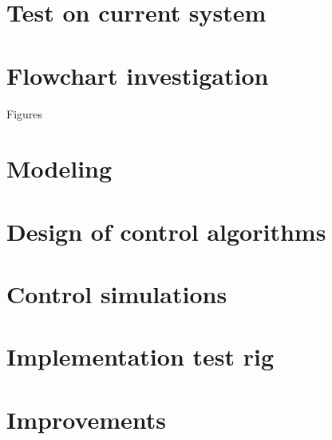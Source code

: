 
\section{Test on current system}

\section{Flowchart investigation}
Figures

\section{Modeling}

\section{Design of control algorithms}

\section{Control simulations}

\section{Implementation test rig}

\section{Improvements}
